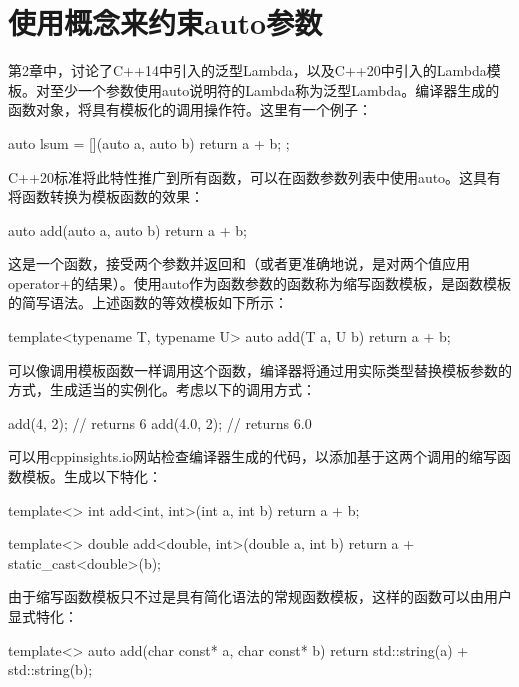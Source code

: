 \section{使用概念来约束auto参数}
第2章中，讨论了C++14中引入的泛型Lambda，以及C++20中引入的Lambda模板。对至少一个参数使用auto说明符的Lambda称为泛型Lambda。编译器生成的函数对象，将具有模板化的调用操作符。这里有一个例子：

\begin{cppcode}
auto lsum = [](auto a, auto b) {return a + b; };
\end{cppcode}

C++20标准将此特性推广到所有函数，可以在函数参数列表中使用auto。这具有将函数转换为模板函数的效果：

\begin{cppcode}
auto add(auto a, auto b)
{
	return a + b;
}
\end{cppcode}

这是一个函数，接受两个参数并返回和（或者更准确地说，是对两个值应用operator+的结果）。使用auto作为函数参数的函数称为缩写函数模板，是函数模板的简写语法。上述函数的等效模板如下所示：

\begin{cppcode}
template<typename T, typename U>
auto add(T a, U b)
{
	return a + b;
}
\end{cppcode}

可以像调用模板函数一样调用这个函数，编译器将通过用实际类型替换模板参数的方式，生成适当的实例化。考虑以下的调用方式：

\begin{cppcode}
add(4, 2); // returns 6
add(4.0, 2); // returns 6.0
\end{cppcode}

可以用cppinsights.io网站检查编译器生成的代码，以添加基于这两个调用的缩写函数模板。生成以下特化：

\begin{cppcode}
template<>
int add<int, int>(int a, int b)
{
	return a + b;
}

template<>
double add<double, int>(double a, int b)
{
	return a + static_cast<double>(b);
}
\end{cppcode}

由于缩写函数模板只不过是具有简化语法的常规函数模板，这样的函数可以由用户显式特化：

\begin{cppcode}
template<>
auto add(char const* a, char const* b)
{
	return std::string(a) + std::string(b);
}
\end{cppcode}

